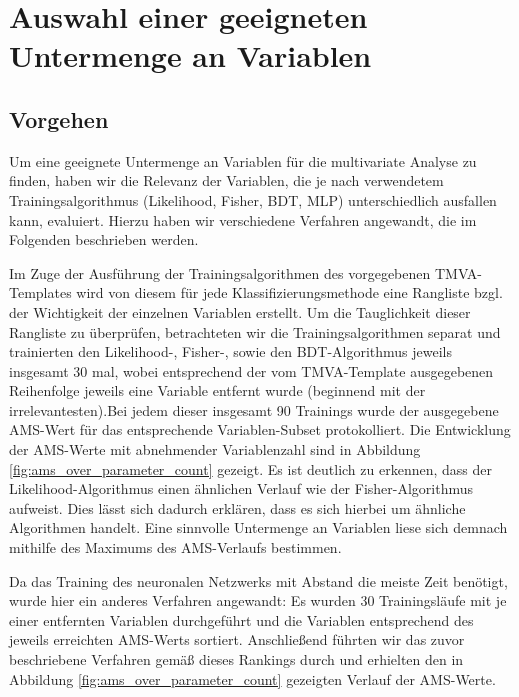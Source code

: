 \section{Auswahl einer geeigneten Untermenge an Variablen}
\label{sec:subset_of_variables}
\subsection{Vorgehen}
Um eine geeignete Untermenge an Variablen für die multivariate Analyse zu finden, haben wir die Relevanz der
Variablen, die je nach verwendetem Trainingsalgorithmus (Likelihood, Fisher, BDT, MLP) unterschiedlich ausfallen kann, evaluiert. Hierzu haben wir verschiedene Verfahren angewandt, die im Folgenden beschrieben werden.


Im Zuge der  Ausführung der Trainingsalgorithmen des vorgegebenen TMVA-Templates wird von diesem für jede Klassifizierungsmethode eine Rangliste bzgl. der Wichtigkeit der einzelnen Variablen erstellt. Um die Tauglichkeit dieser Rangliste zu überprüfen, betrachteten wir die Trainingsalgorithmen separat und trainierten den Likelihood-, Fisher-, sowie den BDT-Algorithmus jeweils insgesamt 30 mal, wobei entsprechend der vom TMVA-Template ausgegebenen Reihenfolge jeweils eine Variable entfernt wurde (beginnend mit der irrelevantesten).Bei jedem dieser insgesamt 90 Trainings wurde der ausgegebene AMS-Wert für das entsprechende Variablen-Subset protokolliert. Die Entwicklung der AMS-Werte mit abnehmender Variablenzahl sind in Abbildung \ref{fig:ams_over_parameter_count} gezeigt. Es ist deutlich zu erkennen, dass der Likelihood-Algorithmus einen ähnlichen Verlauf wie der Fisher-Algorithmus aufweist. Dies lässt sich dadurch erklären, dass es sich hierbei um ähnliche Algorithmen handelt. Eine sinnvolle Untermenge an Variablen liese sich demnach mithilfe des Maximums des AMS-Verlaufs bestimmen.

Da das Training des neuronalen Netzwerks mit Abstand die meiste Zeit benötigt, wurde hier ein anderes Verfahren angewandt: Es wurden 30 Trainingsläufe mit je einer entfernten Variablen durchgeführt und die Variablen entsprechend des jeweils erreichten AMS-Werts sortiert. Anschließend führten wir das zuvor beschriebene Verfahren gemäß dieses Rankings durch und erhielten den in Abbildung \ref{fig:ams_over_parameter_count} gezeigten Verlauf der AMS-Werte.



